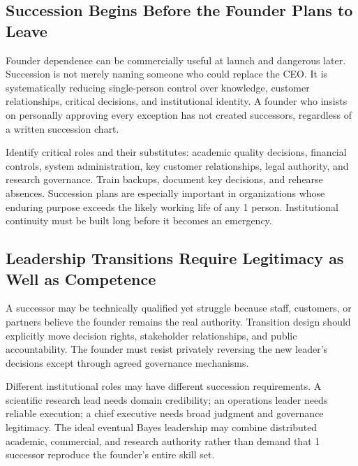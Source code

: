 \subsection{Succession Begins Before the Founder Plans to Leave}
\label{sec:succession_early_planning}

Founder dependence can be commercially useful at launch and dangerous later. Succession is not merely naming someone who could replace the CEO. It is systematically reducing single-person control over knowledge, customer relationships, critical decisions, and institutional identity. A founder who insists on personally approving every exception has not created successors, regardless of a written succession chart.

Identify critical roles and their substitutes: academic quality decisions, financial controls, system administration, key customer relationships, legal authority, and research governance. Train backups, document key decisions, and rehearse absences. Succession plans are especially important in organizations whose enduring purpose exceeds the likely working life of any 1 person. Institutional continuity must be built long before it becomes an emergency.

\subsection{Leadership Transitions Require Legitimacy as Well as Competence}
\label{sec:leadership_transitions_legitimacy}

A successor may be technically qualified yet struggle because staff, customers, or partners believe the founder remains the real authority. Transition design should explicitly move decision rights, stakeholder relationships, and public accountability. The founder must resist privately reversing the new leader's decisions except through agreed governance mechanisms.

Different institutional roles may have different succession requirements. A scientific research lead needs domain credibility; an operations leader needs reliable execution; a chief executive needs broad judgment and governance legitimacy. The ideal eventual Bayes leadership may combine distributed academic, commercial, and research authority rather than demand that 1 successor reproduce the founder's entire skill set.
